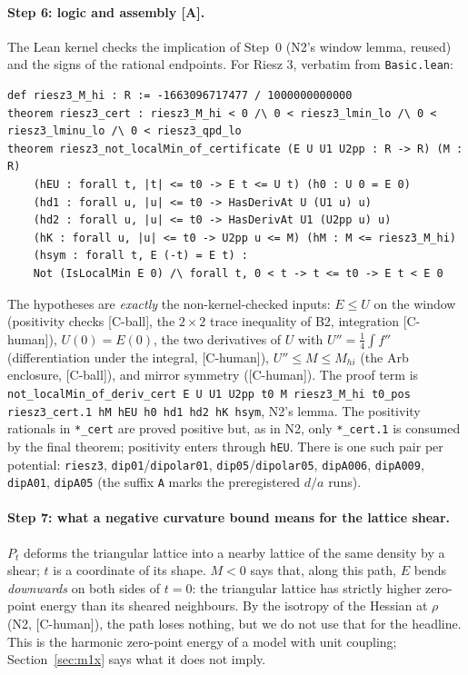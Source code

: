 \documentclass[11pt]{article}
\newcommand{\tier}[1]{\textsf{[#1]}}
\newcommand{\tA}{\tier{A}}
\newcommand{\tCb}{\tier{C-ball}}
\newcommand{\tCh}{\tier{C-human}}
\newcommand{\lean}[1]{\texttt{#1}}
\begin{document}
\paragraph{Step 6: logic and assembly \tA.} The Lean kernel checks the implication of Step~0 (N2's window lemma, reused) and the signs of the rational endpoints. For Riesz 3, verbatim from \lean{Basic.lean}:
\begin{lstlisting}
def riesz3_M_hi : R := -1663096717477 / 1000000000000
theorem riesz3_cert : riesz3_M_hi < 0 /\ 0 < riesz3_lmin_lo /\ 0 < riesz3_lminu_lo /\ 0 < riesz3_qpd_lo
theorem riesz3_not_localMin_of_certificate (E U U1 U2pp : R -> R) (M : R)
    (hEU : forall t, |t| <= t0 -> E t <= U t) (h0 : U 0 = E 0)
    (hd1 : forall u, |u| <= t0 -> HasDerivAt U (U1 u) u)
    (hd2 : forall u, |u| <= t0 -> HasDerivAt U1 (U2pp u) u)
    (hK : forall u, |u| <= t0 -> U2pp u <= M) (hM : M <= riesz3_M_hi)
    (hsym : forall t, E (-t) = E t) :
    Not (IsLocalMin E 0) /\ forall t, 0 < t -> t <= t0 -> E t < E 0
\end{lstlisting}
The hypotheses are \emph{exactly} the non-kernel-checked inputs: $E\le U$ on the window (positivity checks \tCb, the $2\times2$ trace inequality of B2, integration \tCh), $U(0)=E(0)$, the two derivatives of $U$ with $U''=\tfrac14\!\int f''$ (differentiation under the integral, \tCh), $U''\le M\le M_{hi}$ (the Arb enclosure, \tCb), and mirror symmetry (\tCh). The proof term is \lean{not\_localMin\_of\_deriv\_cert E U U1 U2pp t0 M riesz3\_M\_hi t0\_pos riesz3\_cert.1 hM hEU h0 hd1 hd2 hK hsym}, N2's lemma. The positivity rationals in \lean{*\_cert} are proved positive but, as in N2, only \lean{*\_cert.1} is consumed by the final theorem; positivity enters through \lean{hEU}. There is one such pair per potential: \lean{riesz3}, \lean{dip01}/\lean{dipolar01}, \lean{dip05}/\lean{dipolar05}, \lean{dipA006}, \lean{dipA009}, \lean{dipA01}, \lean{dipA05} (the suffix \lean{A} marks the preregistered $d/a$ runs).

\paragraph{Step 7: what a negative curvature bound means for the lattice shear.} $P_t$ deforms the triangular lattice into a nearby lattice of the same density by a shear; $t$ is a coordinate of its shape. $M<0$ says that, along this path, $E$ bends \emph{downwards} on both sides of $t=0$: the triangular lattice has strictly higher zero-point energy than its sheared neighbours. By the isotropy of the Hessian at $\rho$ (N2, \tCh), the path loses nothing, but we do not use that for the headline. This is the harmonic zero-point energy of a model with unit coupling; Section~\ref{sec:m1x} says what it does not imply.
\end{document}
